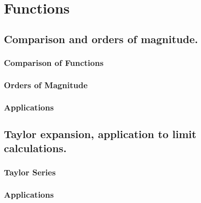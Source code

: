 \chapter{Functions} \label{functions}
\section{Comparison and orders of magnitude.}\label{functions:comp/ord}
\subsection*{Comparison of Functions}\label{functions:comp/ord:comp}
\subsection*{Orders of Magnitude}\label{functions:comp/ord:ord}
\subsection*{Applications}\label{functions:comp/ord:app}

\section{Taylor expansion, application to limit calculations.}\label{functions:taylor}
\subsection*{Taylor Series}\label{functions:taylor:taylor}
\subsection*{Applications}\label{functions:taylor:app}